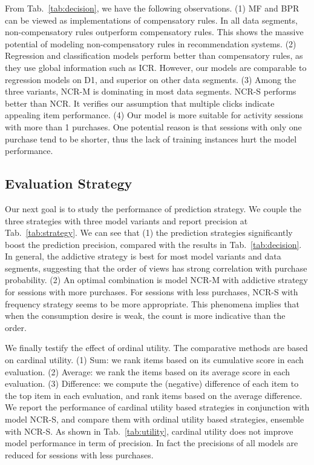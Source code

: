 \documentclass[sigconf]{acmart}
\begin{document}
From Tab.~\ref{tab:decision}, we have the following observations. (1) MF and BPR can be viewed as implementations of compensatory rules. In all data segments, non-compensatory rules outperform compensatory rules. This shows the massive potential of modeling non-compensatory rules in recommendation systems. (2) Regression and classification models perform better than compensatory rules, as they use global information such as ICR. However, our models are comparable to regression models on D1, and superior on other data segments. (3) Among the three variants, NCR-M is dominating in most data segments. NCR-S performs better than NCR. It verifies our assumption that multiple clicks indicate appealing item performance. (4) Our model is more suitable for activity sessions with more than 1 purchases. One potential reason is that sessions with only one purchase tend to be shorter, thus the lack of training instances hurt the model performance.  



\subsection{Evaluation Strategy}


Our next goal is to study the performance of prediction strategy. We couple the three strategies with three model variants and report precision at Tab.~\ref{tab:strategy}. We can see that (1) the prediction strategies significantly boost the prediction precision, compared with the results in Tab.~\ref{tab:decision}. In general, the addictive strategy is best for most model variants and data segments, suggesting that the order of views has strong correlation with purchase probability.  (2) An optimal combination is model NCR-M with addictive strategy for sessions with more purchases. For sessions with less purchases, NCR-S with frequency strategy seems to be more appropriate. This phenomena implies that when the consumption desire is weak, the count is more indicative than the order. 

We finally testify the effect of ordinal utility. The comparative methods are based on  cardinal utility. (1) Sum: we rank items based on its cumulative score in each evaluation. (2) Average: we rank the items based on its average score in each evaluation. (3) Difference: we compute the (negative) difference of each item to the top item in each evaluation, and rank items based on the average difference. We report the performance of cardinal utility based strategies in conjunction with model NCR-S, and compare them with ordinal utility based strategies, ensemble with NCR-S. As shown in Tab.~\ref{tab:utility}, cardinal utility does not improve model performance in term of precision. In fact the precisions of all models are reduced for sessions with less purchases. 
\end{document}
